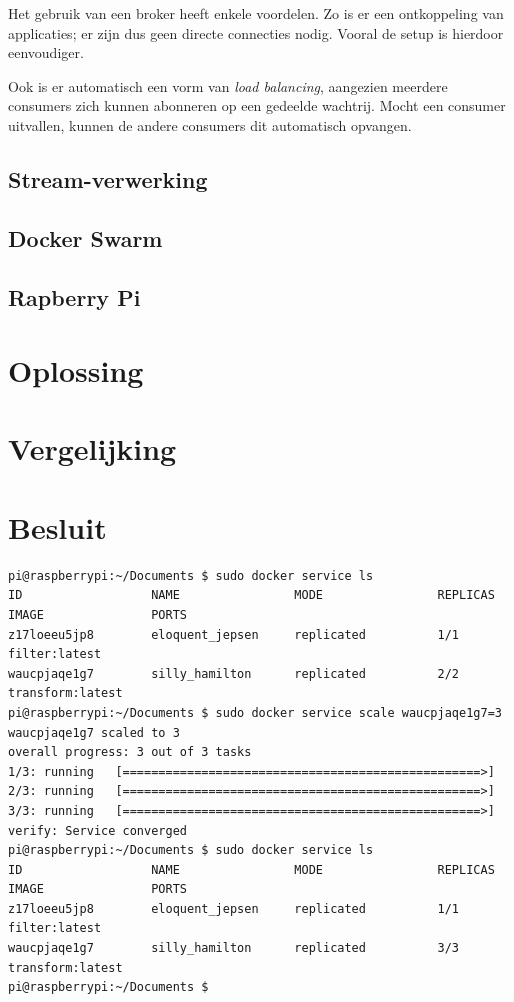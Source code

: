 \documentclass[twocolumn, a4paper]{article}
\begin{document}
Het gebruik van een broker heeft enkele voordelen. Zo is er een ontkoppeling van applicaties; er zijn dus geen directe connecties nodig. Vooral de setup is hierdoor eenvoudiger. 

Ook is er automatisch een vorm van \emph{load balancing}, aangezien meerdere consumers zich kunnen abonneren op een gedeelde wachtrij. Mocht een consumer uitvallen, kunnen de andere consumers dit automatisch opvangen. 

\subsection{Stream-verwerking}\label{ss:stream}

\subsection{Docker Swarm}\label{ss:swarm}
\subsection{Rapberry Pi}\label{ss:rpi}

\section{Oplossing}

\section{Vergelijking}

\section{Besluit}
\onecolumn

\appendix

\begin{verbatim}
pi@raspberrypi:~/Documents $ sudo docker service ls
ID                  NAME                MODE                REPLICAS            IMAGE               PORTS
z17loeeu5jp8        eloquent_jepsen     replicated          1/1                 filter:latest       
waucpjaqe1g7        silly_hamilton      replicated          2/2                 transform:latest    
pi@raspberrypi:~/Documents $ sudo docker service scale waucpjaqe1g7=3
waucpjaqe1g7 scaled to 3
overall progress: 3 out of 3 tasks 
1/3: running   [==================================================>] 
2/3: running   [==================================================>] 
3/3: running   [==================================================>] 
verify: Service converged 
pi@raspberrypi:~/Documents $ sudo docker service ls
ID                  NAME                MODE                REPLICAS            IMAGE               PORTS
z17loeeu5jp8        eloquent_jepsen     replicated          1/1                 filter:latest       
waucpjaqe1g7        silly_hamilton      replicated          3/3                 transform:latest    
pi@raspberrypi:~/Documents $ 
\end{verbatim}

\newpage

\end{document}

